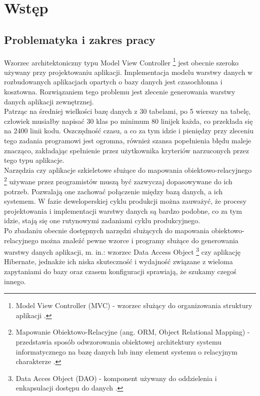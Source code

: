 \documentclass[12pt]{report}
\begin{document}
\tableofcontents	%

\chapter{Wstęp}\label{chap:wstep} 

\section{Problematyka i zakres pracy}
Wzorzec architektoniczny typu Model View Controller
	\footnote{Model View Controller (MVC) - wzorzec służący do organizowania struktury aplikacji \cite{mvc}.}
jest obecnie szeroko używany przy projektowaniu aplikacji. Implementacja modelu warstwy danych w
rozbudowanych aplikacjach opartych o bazy danych jest czasochłonna i kosztowna. Rozwiązaniem tego
problemu jest zlecenie generowania warstwy danych aplikacji zewnętrznej. \\
	\indent Patrząc na średniej wielkości bazę danych z 30 tabelami, po 5 wierszy na tabelę,
człowiek musiałby napisać 30 klas po minimum 80 linijek każda, co przekłada się na 2400 linii kodu. 
Oszczędność czasu, a co za tym idzie i pieniędzy przy zleceniu tego zadania programowi jest ogromna,
również szansa popełnienia błędu maleje znacząco, zakładając spełnienie przez użytkownika
kryteriów narzuconych przez tego typu aplikacje. \\
	\indent Narzędzia czy aplikacje szkieletowe służące do mapowania obiektowo-relacyj\-nego
	\footnote{Mapowanie Obiektowo-Relacyjne (ang. ORM, Object Relational Mapping) - przedstawia sposób odwzorowania obiektowej architektury
	systemu informatycznego na bazę danych lub inny element systemu o relacyjnym charakterze \cite{hibernateInAction}.}
używane przez programistów muszą być zazwyczaj dopasowywane do ich potrzeb. Pozwalają one zachować połączenie między bazą
danych, a ich systemem. W fazie deweloperskiej cyklu produkcji można zauważyć, że procesy projektowania i implementacji warstwy danych są bardzo podobne, co za tym idzie,
stają się one rutynowymi zadaniami cyklu produkcyjnego. \\
	\indent Po zbadaniu obecnie dostępnych narzędzi służących do mapowania obiektowo-relacyjnego
można znaleźć pewne wzorce i programy służące do generowania warstwy danych aplikacji, m. in.: wzorzec Data Access Object
	\footnote{Data Acces Object (DAO) - komponent używany do oddzielenia i enkapsulacji dostępu do danych \cite{dao}.}
 czy aplikację Hibernate, jednakże ich niska skuteczność i wydajność związane z wieloma zapytaniami do bazy oraz czasem konfiguracji sprawiają, że szukamy czegoś innego.
\end{document}
